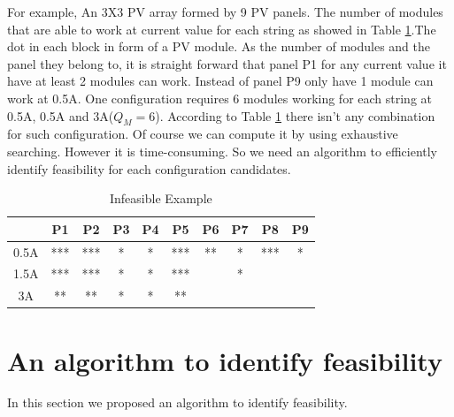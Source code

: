 \documentclass[conference]{IEEEtran}
\begin{document}
For example, An 3X3 PV array formed by 9 PV panels. The number of modules that are able to work at current value for each string as showed in Table \ref{not_feasible}.The dot in each block in form of a PV module. As the number of modules and the panel they belong to, it is straight forward that panel P1 for any current value it have at least 2 modules can work. Instead of panel P9 only have 1 module can work at 0.5A.
One configuration requires 6 modules working for each string at 0.5A, 0.5A and 3A($Q_M = 6$). According to Table \ref{not_feasible} there isn't any combination for such configuration. Of course we can compute it by using exhaustive searching. However it is time-consuming. So we need an algorithm to efficiently identify feasibility for each configuration candidates.

\begin{table}[htbp]
    \caption{Infeasible Example}
    \begin{center}
    \begin{tabular}{c|c|c|c|c|c|c|c|c|c}
    \hline\hline
             & P1 & P2  & P3  & P4 & P5 & P6  & P7  & P8  & P9  \\ \hline
         0.5A & ***& *** & *   & *  & ***& **  & *   & *** & * \\ \hline
         1.5A & ***& *** & *   & *  & ***&     & *   &     &   \\ \hline
         3A   & ** & **  & *   & *  & ** &     &     &     &   \\\hline \hline
    \end{tabular}
    \label{not_feasible}
    \end{center}
\end{table}
\section{An algorithm to identify feasibility}\label{Sec5}
In this section we proposed an algorithm to identify feasibility.
\end{document}
